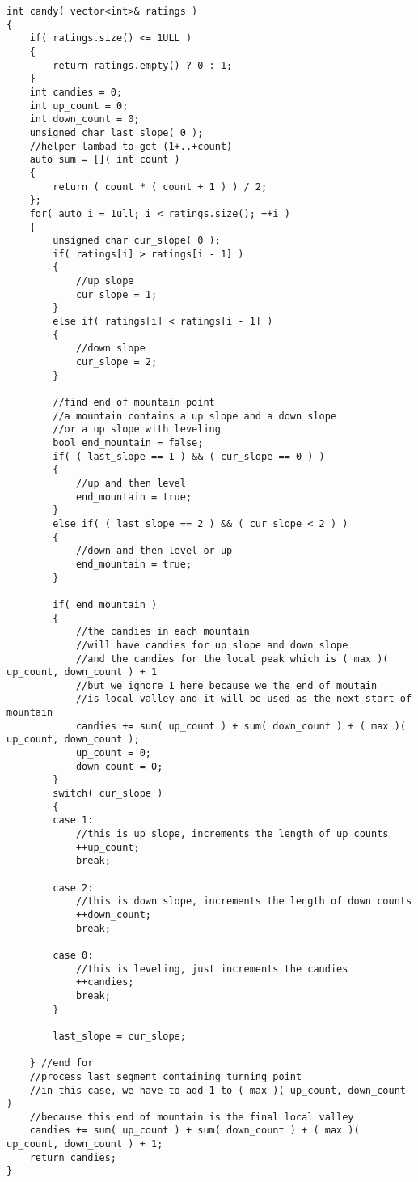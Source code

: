 \begin{lstlisting}[style=customc, caption={Up And Down Slope}]
int candy( vector<int>& ratings )
{
    if( ratings.size() <= 1ULL )
    {
        return ratings.empty() ? 0 : 1;
    }
    int candies = 0;
    int up_count = 0;
    int down_count = 0;
    unsigned char last_slope( 0 );
    //helper lambad to get (1+..+count)
    auto sum = []( int count )
    {
        return ( count * ( count + 1 ) ) / 2;
    };
    for( auto i = 1ull; i < ratings.size(); ++i )
    {
        unsigned char cur_slope( 0 );
        if( ratings[i] > ratings[i - 1] )
        {
            //up slope
            cur_slope = 1;
        }
        else if( ratings[i] < ratings[i - 1] )
        {
            //down slope
            cur_slope = 2;
        }

        //find end of mountain point
        //a mountain contains a up slope and a down slope
        //or a up slope with leveling
        bool end_mountain = false;
        if( ( last_slope == 1 ) && ( cur_slope == 0 ) )
        {
            //up and then level
            end_mountain = true;
        }
        else if( ( last_slope == 2 ) && ( cur_slope < 2 ) )
        {
            //down and then level or up
            end_mountain = true;
        }

        if( end_mountain )
        {
            //the candies in each mountain
            //will have candies for up slope and down slope
            //and the candies for the local peak which is ( max )( up_count, down_count ) + 1
            //but we ignore 1 here because we the end of moutain
            //is local valley and it will be used as the next start of mountain
            candies += sum( up_count ) + sum( down_count ) + ( max )( up_count, down_count );
            up_count = 0;
            down_count = 0;
        }
        switch( cur_slope )
        {
        case 1:
            //this is up slope, increments the length of up counts
            ++up_count;
            break;

        case 2:
            //this is down slope, increments the length of down counts
            ++down_count;
            break;

        case 0:
            //this is leveling, just increments the candies
            ++candies;
            break;
        }

        last_slope = cur_slope;

    } //end for
    //process last segment containing turning point
    //in this case, we have to add 1 to ( max )( up_count, down_count )
    //because this end of mountain is the final local valley
    candies += sum( up_count ) + sum( down_count ) + ( max )( up_count, down_count ) + 1;
    return candies;
}
\end{lstlisting}
